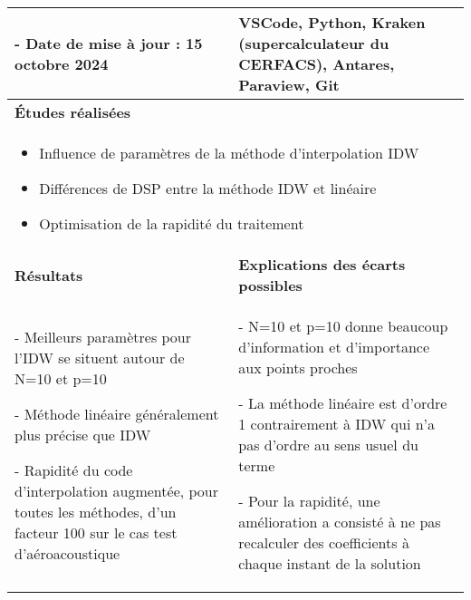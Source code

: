 \begin{table}[ht]
\begin{tabular}{|p{6.5cm}|p{8.5cm}|}
\begin{minipage}[t]{6.5cm}
- Date de mise à jour : 15 octobre 2024
\end{minipage} & 
\begin{minipage}[t]{8.5cm}
VSCode, Python, Kraken (supercalculateur du CERFACS), Antares, Paraview, Git
\end{minipage} \\ 
\hline
\multicolumn{2}{|l|}{\textbf{Études réalisées}} \\ 
\hline
\multicolumn{2}{|p{14cm}|}{
\begin{minipage}[t]{14cm}
\begin{itemize}
    \item Influence de paramètres de la méthode d'interpolation IDW
    \item Différences de DSP entre la méthode IDW et linéaire
    \item Optimisation de la rapidité du traitement
    \hspace{0.5cm}
\end{itemize}
\end{minipage}
} \\ 
\hline
\textbf{Résultats} & \textbf{Explications des écarts possibles} \\ 
\hline
\begin{minipage}[t]{6.5cm}

- Meilleurs paramètres pour l'IDW se situent autour de N=10 et p=10

- Méthode linéaire généralement plus précise que IDW

- Rapidité du code d'interpolation augmentée, pour toutes les méthodes, d'un facteur 100 sur le cas test d'aéroacoustique

\end{minipage} & 
\begin{minipage}[t]{8.5cm}

- N=10 et p=10 donne beaucoup d'information et d'importance aux points proches

- La méthode linéaire est d'ordre 1 contrairement à IDW qui n'a pas d'ordre au sens usuel du terme

- Pour la rapidité, une amélioration a consisté à ne pas recalculer des coefficients à chaque instant de la solution


\end{minipage}
\end{tabular}
\end{table}
